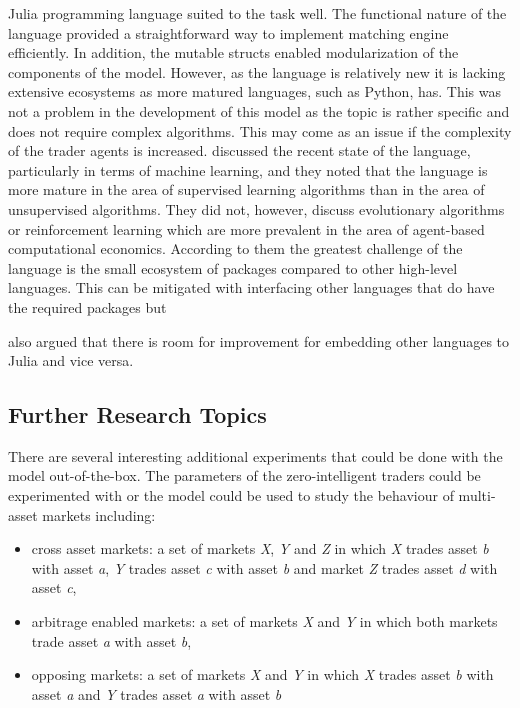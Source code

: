 Julia programming language suited to the task well. The functional nature
of the language provided a straightforward way to implement matching engine
efficiently. In addition, the mutable structs enabled modularization of the
components of the model. However, as the language is relatively new it is
lacking extensive ecosystems as more matured languages, such as Python,
has. This was not a problem in the development of this model as the topic is 
rather specific and does not require complex algorithms. This may come as an
issue if the complexity of the trader agents is increased. \citet{JuliaML2020} 
discussed the recent state of the language, particularly in terms of machine 
learning, and they noted that the language is more mature in the area of
supervised learning algorithms than in the area of unsupervised algorithms.
They did not, however, discuss evolutionary algorithms or reinforcement
learning which are more prevalent in the area of agent-based computational economics.
According to them the greatest challenge of the language is the small ecosystem
of packages compared to other high-level languages. This can be mitigated
with interfacing other languages that do have the required packages but 
\author{JuliaML2020} also argued that there is room for improvement for embedding
other languages to Julia and vice versa.

\subsection{Further Research Topics}
There are several interesting additional experiments that could be done with
the model out-of-the-box. The parameters of the zero-intelligent traders could
be experimented with or the model could be used to study the behaviour of 
multi-asset markets including:
\begin{itemize}
    \item cross asset markets: a set of markets \emph{X}, \emph{Y} and \emph{Z} 
        in which \emph{X} trades asset \emph{b} with asset \emph{a}, 
        \emph{Y} trades asset \emph{c} with asset \emph{b} 
        and market \emph{Z} trades asset \emph{d} with asset \emph{c},
    \item arbitrage enabled markets: a set of markets \emph{X} and \emph{Y} 
        in which both markets trade asset \emph{a} with asset \emph{b},
    \item opposing markets: a set of markets \emph{X} and \emph{Y} 
        in which \emph{X} trades asset \emph{b} with asset \emph{a} 
        and \emph{Y} trades asset \emph{a} with asset \emph{b}
\end{itemize}

